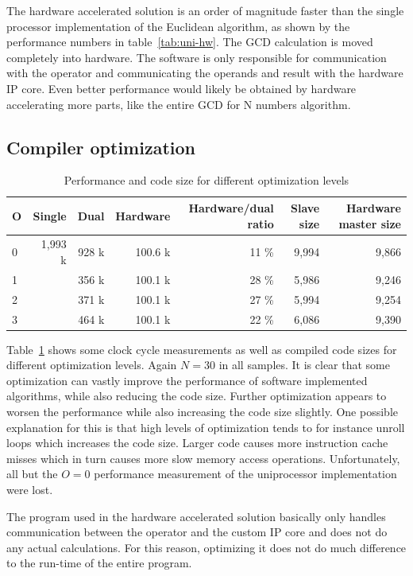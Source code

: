 \documentclass[11pt]{article}
\begin{document}
The hardware accelerated solution is an order of magnitude faster than the single processor implementation of the Euclidean algorithm, as shown by the performance numbers in table~\ref{tab:uni-hw}. The GCD calculation is moved completely into hardware. The software is only responsible for communication with the operator and communicating the operands and result with the hardware IP core. Even better performance would likely be obtained by hardware accelerating more parts, like the entire GCD for N numbers algorithm.

\subsection{Compiler optimization}

\begin{table}
  \centering
  \begin{tabular}{l|rrrrrr}
    \toprule
    O & Single  & Dual  & Hardware  & Hardware/dual ratio & Slave size & Hardware master size \\
    \midrule
    0 & 1,993 k & 928 k & 100.6 k & 11 \% & 9,994 & 9,866 \\
    1 &         & 356 k & 100.1 k & 28 \% & 5,986 & 9,246 \\
    2 &         & 371 k & 100.1 k & 27 \% & 5,994 & 9,254 \\
    3 &         & 464 k & 100.1 k & 22 \% & 6,086 & 9,390 \\
    \bottomrule
  \end{tabular}
  \caption{Performance and code size for different optimization levels}
  \label{tab:opt}
\end{table}

Table~\ref{tab:opt} shows some clock cycle measurements as well as compiled code sizes for different optimization levels. Again $N=30$ in all samples. It is clear that some optimization can vastly improve the performance of software implemented algorithms, while also reducing the code size. Further optimization appears to worsen the performance while also increasing the code size slightly. One possible explanation for this is that high levels of optimization tends to for instance unroll loops which increases the code size. Larger code causes more instruction cache misses which in turn causes more slow memory access operations. Unfortunately, all but the $O=0$ performance measurement of the uniprocessor implementation were lost.

The program used in the hardware accelerated solution basically only handles communication between the operator and the custom IP core and does not do any actual calculations. For this reason, optimizing it does not do much difference to the run-time of the entire program.
\end{document}
